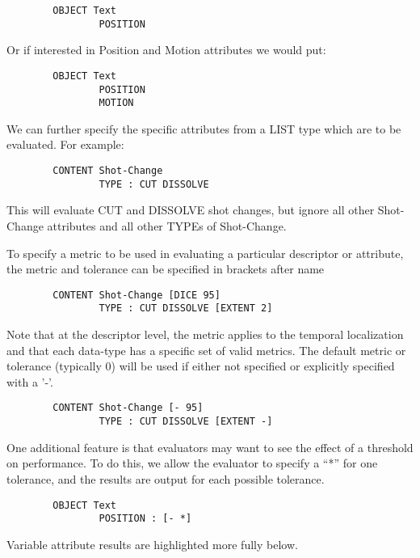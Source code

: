 \begin{verbatim}
        OBJECT Text
                POSITION
\end{verbatim}

Or if interested in Position and Motion attributes we would put:

\begin{verbatim}
        OBJECT Text
                POSITION
                MOTION
\end{verbatim}

We can further specify the specific attributes from a LIST type which
are to be evaluated.  For example:


\begin{verbatim}
        CONTENT Shot-Change 
                TYPE : CUT DISSOLVE
\end{verbatim}

This will evaluate CUT and DISSOLVE shot changes, but ignore all other
Shot-Change attributes and all other TYPEs of Shot-Change.

To specify a metric to be used in evaluating a particular descriptor
or attribute, the metric and tolerance can be specified in brackets
after name
\begin{verbatim}
        CONTENT Shot-Change [DICE 95]
                TYPE : CUT DISSOLVE [EXTENT 2]
\end{verbatim}

Note that at the descriptor level, the metric applies to the temporal
localization and that each data-type has a specific set of valid
metrics.  The default metric or tolerance (typically 0) will be used
if either not specified or explicitly specified with a '-'.

\begin{verbatim}
        CONTENT Shot-Change [- 95]    
                TYPE : CUT DISSOLVE [EXTENT -]
\end{verbatim}

One additional feature is that evaluators may want to see the effect
of a threshold on performance.  To do this, we allow the evaluator to
specify a ``*'' for one tolerance, and the results are output for each
possible tolerance.


\begin{verbatim}
        OBJECT Text
                POSITION : [- *]
\end{verbatim}

 Variable attribute results are highlighted more fully below.

